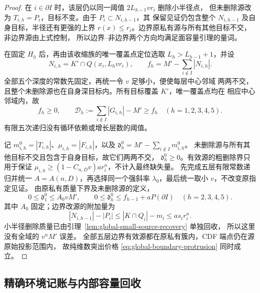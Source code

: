 \begin{proof}
在 \(i\in\partial I\) 时，该层仍以同一阈值 \(2L_{h-1}vr_i\) 删除小半径点，
但未删除源改为 \(T_{i,h}=P_i\)，目标不变。由于 \(P_i\subset N_{i,h-1}\)，其
保留见证仍包含整个 \(N_{i,h-1}\) 及自身目标，半径还有更强的上界
\(r(x)\le r_i\)。边界原私有源与所有其他目标不交，非边界源由上式控制，
所以边界--非边界两个方向均满足面容量引理的量词。

在固定 \(H_h\) 后，再由该收缩族的唯一覆盖点定位选取
\(L_h>L_{h-1}+1\)，并设
\[
 N_{i,h}=K'\cap Q(x_i,L_hvr_i),\qquad
 f_h=M'-\sum_{i\notin I}|N_{i,h}|.
\]
全部五个深度的常数先固定，再统一令 \(v\) 足够小，便使每层中心邻域
两两不交，且整个未删除源也在自身深目标内。所有目标覆盖 \(K'\)，唯一覆盖点均在
相应中心邻域内，故
\begin{equation}\label{eq:global-multidepth-duplicates}
 f_h\ge0,\qquad
 \mathcal D_h:=\sum_{i\notin I}|G_{i,h}|-M'\ge f_h
 \quad(h=1,2,3,4,5).
\end{equation}
有限五次递归没有循环依赖或增长层数的阈值。

记 \(m_{i,h}^0=|T_{i,h}|\)、\(\mu_{i,h}=|F_{i,h}|\)，以及
\(\mathfrak d_h^0=M'-\sum_{i\notin I}m_{i,h}^0\)。
未删除源与所有其他目标不交且包含于自身目标，故它们两两不交，
\(\mathfrak d_h^0\ge0\)。有效源的粗删除界只用于保证
\(\mu_{i,h}\ge(1-C_{n,D}v)ar_i^n\)，不计入最终缺失量。
先完成五层有限常数递归并统一 \(A=A(n,D)\)，再选择同一个强斜率
\(\lambda_0\)，最后统一取小 \(v\)，不改变原指定见证。
由原私有质量下界及未删除源的定义，
\begin{equation}\label{eq:global-two-source-losses}
 0\le\mathfrak d_1^0\le A_0vM',\qquad
 0\le\mathfrak d_h^0\le f_{h-1}+aP(\partial I)
 \quad(h=2,3,4,5).
\end{equation}
其中 \(A_0\) 固定；边界改源的附加量为
\[
 |N_{i,h-1}|-|P_i|\le |K\cap Q_i|-m_i\le as_ir_i^n.
\]
小半径删除质量已由引理~\ref{lem:global-small-source-recovery} 单独回收，
所以这里没有全域的 \(v^nM'\) 误差。
全部五层边界有效源都在原私有簇内，CDF 端点仍在源原始投影范围内，
故纯维数突出价格 \eqref{eq:global-boundary-protrusion} 同时成立。
\end{proof}

\subsection{精确环境记账与内部容量回收}

